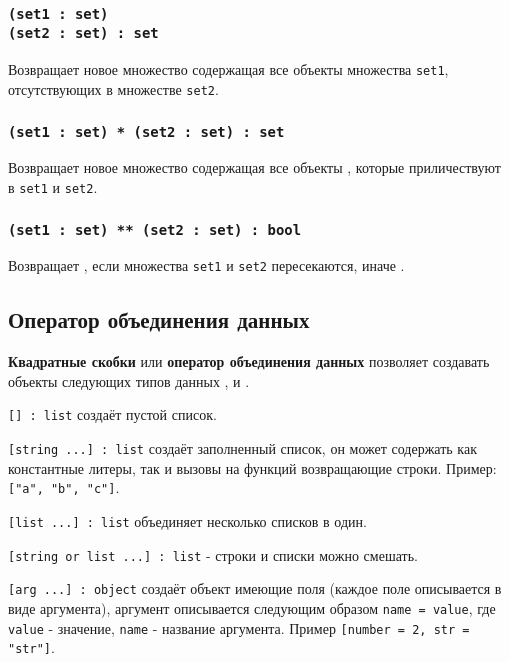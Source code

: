 \subsubsection{\texttt{(set1 : set) \\ (set2 : set) : set}}

Возвращает новое множество содержащая все объекты множества \texttt{set1}, отсутствующих в множестве \texttt{set2}.

\subsubsection{\texttt{(set1 : set) * (set2 : set) : set}}

Возвращает новое множество содержащая все объекты , которые приличествуют в \texttt{set1} и \texttt{set2}.

\subsubsection{\texttt{(set1 : set) ** (set2 : set) : bool}}

Возвращает \true, если множества \texttt{set1} и \texttt{set2} пересекаются, иначе \false.

\subsection{Оператор объединения данных}

{\bf Квадратные скобки} или {\bf оператор объединения данных} позволяет создавать объекты следующих типов данных \listtype{}, \set{} и \object{}.

\texttt{[] : list} создаёт пустой список.

\texttt{[string ...] : list} создаёт заполненный список, он может содержать как константные литеры, так и вызовы на функций возвращающие строки. Пример: \texttt{["a", "b", "c"]}.

\texttt{[list ...] : list} объединяет несколько списков в один.

\texttt{[string or list ...] : list} - строки и списки можно смешать.

\texttt{[arg ...] : object} создаёт объект имеющие поля (каждое поле описывается в виде аргумента), аргумент описывается следующим образом \texttt{name = value}, где \texttt{value} - значение, \texttt{name} - название аргумента. Пример \texttt{[number = 2, str = "str"]}.

